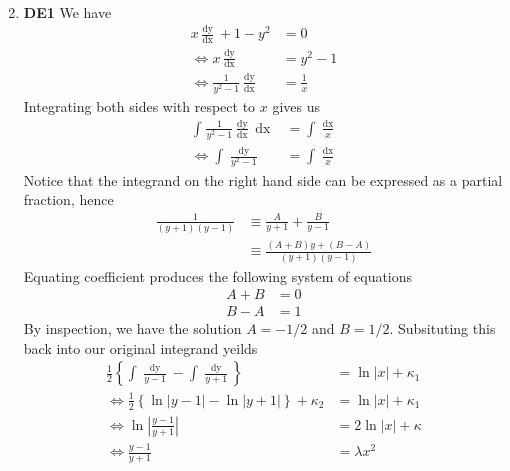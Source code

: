 \documentclass[12pt,oneside]{book}
\begin{document}
\begin{enumerate}
\begin{enumerate}
\begin{align*}
            \end{align*}
        \end{enumerate}
        \item \textbf{DE1} We have \begin{align*}
            x \frac{\mathop{\mathrm{d}y}}{\mathop{\mathrm{d}x}} + 1 - y^2 &= 0 \\
            \iff x \frac{\mathop{\mathrm{d}y}}{\mathop{\mathrm{d}x}} &= y^2 - 1 \\
            \iff \frac{1}{y^2 - 1} \frac{\mathop{\mathrm{d}y}}{\mathop{\mathrm{d}x}} &= \frac{1}{x}
        \end{align*}
        Integrating both sides with respect to $x$ gives us \begin{align*}
            \int_{}^{} \frac{1}{y^2 - 1} \frac{\mathop{\mathrm{d}y}}{\mathop{\mathrm{d}x}} \mathop{\mathrm{d}x} &= \int_{}^{} \frac{\mathop{\mathrm{d}x} }{x} \\
            \iff \int_{}^{} \frac{\mathop{\mathrm{d}y} }{y^2 - 1} &= \int_{}^{} \frac{\mathop{\mathrm{d}x} }{x}    
        \end{align*}
        Notice that the integrand on the right hand side can be expressed as a partial fraction, hence \begin{align*}
            \frac{1}{(y + 1)(y - 1)} &\equiv \frac{A}{y + 1} + \frac{B}{y - 1} \\
            &\equiv \frac{(A + B)y + (B - A)}{(y + 1) (y - 1)}
        \end{align*}
        Equating coefficient produces the following system of equations \begin{align*}
            A + B &= 0 \\
            B - A &= 1
        \end{align*}
        By inspection, we have the solution $A = -1/2$ and $B = 1/2$. Subsituting this back into our original integrand yeilds \begin{align*}
            \frac{1}{2} \left\{ \int_{}^{} \frac{\mathop{\mathrm{d}y} }{y - 1} - \int_{}^{} \frac{\mathop{\mathrm{d}y} }{y + 1}   \right\}  &= \ln \left| x \right| + \kappa_1 \\
            \iff \frac{1}{2} \left\{ \ln \left| y - 1 \right| - \ln \left| y + 1 \right| \right \} + \kappa_2 &= \ln \left| x \right| + \kappa_1 \\
            \iff \ln \left| \frac{y - 1}{y + 1} \right| &= 2 \ln \left| x \right| + \kappa \\
            \iff \frac{y-1}{y+1} &= \lambda x^2

\end{align*}
\end{enumerate}
\end{document}
